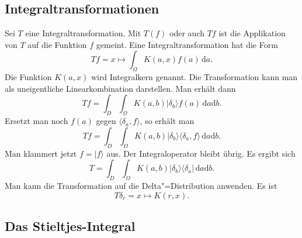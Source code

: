 \documentclass[a4paper,10pt,fleqn,twocolumn,twoside]{article}
\numberwithin{equation}{section}
\begin{document}
\subsection{Integraltransformationen}

Sei $T$ eine Integraltransformation. Mit $T(f)$ oder auch
$Tf$ ist die Applikation von $T$ auf die Funktion $f$ gemeint.
Eine Integraltransformation hat die Form
\begin{equation}
Tf = x\mapsto \int_{\Omega} K(a,x)f(a)\,\mathrm da.
\end{equation}
%
Die Funktion $K(a,x)$ wird Integralkern genannt. Die Transformation
kann man als uneigentliche Linearkombination darstellen.
Man erhält dann
\begin{equation}
Tf = \int_{D}\int_{\Omega} K(a,b)
|\delta_b\rangle f(a)\,\mathrm da\mathrm db.
\end{equation}
%
Ersetzt man noch $f(a)$ gegen $\langle\delta_a,f\rangle$,
so erhält man
\begin{equation}
Tf = \int_{D}\int_{\Omega} K(a,b)
|\delta_b\rangle\langle\delta_a,f\rangle\,\mathrm da\mathrm db.
\end{equation}
%
Man klammert jetzt $f=|f\rangle$ aus. Der Integraloperator bleibt
übrig. Es ergibt sich
\begin{equation}
T = \int_{D}\int_{\Omega} K(a,b)
|\delta_b\rangle\langle\delta_a|\,\mathrm da\mathrm db.
\end{equation}
%
Man kann die Transformation auf die Delta"=Distribution anwenden.
Es ist
\begin{equation}
T\delta_r = x\mapsto K(r,x).
\end{equation}

\subsection{Das Stieltjes-Integral}
\end{document}
